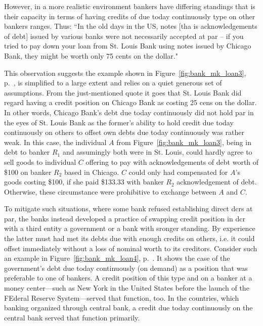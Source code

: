 However, in a more realistic environment bankers have differing standings that is their capacity in terms of having credits of due today continuously type on other bankers ranges. Thus: ``In the old days in the US, notes [tha is acknowledgements of debt] issued by various banks were not necessarily accepted at par -- if you tried to pay down your loan from St. Louis Bank using notes issued by Chicago Bank, they might be worth only 75 cents on the dollar." \citep[p.~4]{wray2015} 

This observation suggests the example shown in Figure~\ref{fig:bank_mk_loan3}, p.~\pageref{fig:bank_mk_loan3}, is simplified to a large extent and relies on a quiet generous set of assumptions. From the just-mentioned quote it goes that St. Louis Bank did regard having a credit position on Chicago Bank as costing 25 cens on the dollar. In other words, Chicago Bank's debt due today continuously did not hold par in the eyes of St. Louis Bank as the former's ability to hold credit due today continuously on others to offset own debts due today continuously was rather weak. In this case, the individual $A$ from Figure~\ref{fig:bank_mk_loan3}, being in debt to banker $R_1$ and assumingly both were in St. Louis, could hardly agree to sell goods to individual $C$ offering to pay with acknowledgements of debt worth of \$100 on banker $R_2$ based in Chicago. $C$ could only had compensated for $A$'s goods costing \$100, if she paid \$133.33 with banker $R_2$ acknowledgement of debt. Otherwise, these circumstance were prohibitive to exchange between $A$ and $C$.

To mitigate such situations, where some bank refused establishing direct \acfp{dcr} at par, the banks instead developed a practice of swapping credit position in \ac{dcr} with a third entity a government or a bank with sronger standing. By experience the latter must had met its debts due with enough credits on others, i.e. it could offset immediately without a loss of nominal worth to its creditors. Consider such an example in Figure~\ref{fig:bank_mk_loan4}, p.~\pageref{fig:bank_mk_loan4}. It shows the case of the government's debt due today continuously (on demand) as a position that was preferable to one of bankers. A credit position of this type and on a banker at a money center---such as New York in the United States before the launch of the FEderal Reserve System---served that function, too. In the countries, which banking organized through central bank, a credit due today continuously on the central bank served that function primarily.

